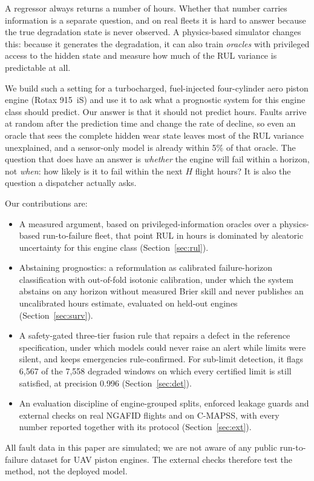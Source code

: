 A regressor always returns a number of hours. Whether that number carries information is a separate question, and on real fleets it is hard to answer because the true degradation state is never observed. A physics-based simulator changes this: because it generates the degradation, it can also train \emph{oracles} with privileged access to the hidden state and measure how much of the RUL variance is predictable at all.

We build such a setting for a turbocharged, fuel-injected four-cylinder aero piston engine (Rotax 915~iS) and use it to ask what a prognostic system for this engine class should predict. Our answer is that it should not predict hours. Faults arrive at random after the prediction time and change the rate of decline, so even an oracle that sees the complete hidden wear state leaves most of the RUL variance unexplained, and a sensor-only model is already within 5\% of that oracle. The question that does have an answer is \emph{whether} the engine will fail within a horizon, not \emph{when}: how likely is it to fail within the next $H$ flight hours? It is also the question a dispatcher actually asks.

Our contributions are:
\begin{itemize}
\item A measured argument, based on privileged-information oracles over a physics-based run-to-failure fleet, that point RUL in hours is dominated by aleatoric uncertainty for this engine class (Section~\ref{sec:rul}).
\item Abstaining prognostics: a reformulation as calibrated failure-horizon classification with out-of-fold isotonic calibration, under which the system abstains on any horizon without measured Brier skill and never publishes an uncalibrated hours estimate, evaluated on held-out engines (Section~\ref{sec:surv}).
\item A safety-gated three-tier fusion rule that repairs a defect in the reference specification, under which models could never raise an alert while limits were silent, and keeps emergencies rule-confirmed. For sub-limit detection, it flags 6,567 of the 7,558 degraded windows on which every certified limit is still satisfied, at precision 0.996 (Section~\ref{sec:det}).
\item An evaluation discipline of engine-grouped splits, enforced leakage guards and external checks on real NGAFID flights and on C-MAPSS, with every number reported together with its protocol (Section~\ref{sec:ext}).
\end{itemize}
All fault data in this paper are simulated; we are not aware of any public run-to-failure dataset for UAV piston engines. The external checks therefore test the method, not the deployed model.

